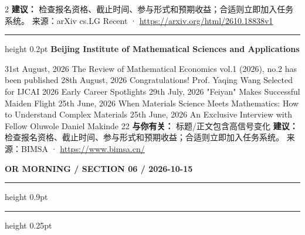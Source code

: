 \documentclass[10.5pt]{ctexart}
\begin{document}
\begin{multicols}{2}
\textbf{建议：} 检查报名资格、截止时间、参与形式和预期收益；合适则立即加入任务系统。
{\footnotesize\color{ormuted} 来源：arXiv cs.LG Recent · \url{https://arxiv.org/html/2610.18838v1}}
\vspace{2mm}
\hrule height 0.2pt
\vspace{2mm}
{\large\bfseries Beijing Institute of Mathematical Sciences and Applications}\par
31st August, 2026 The Review of Mathematical Economics vol.1 (2026), no.2 has been published 28th August, 2026 Congratulations! Prof. Yaqing Wang Selected for IJCAI 2026 Early Career Spotlights 29th July, 2026 "Feiyan" Makes Successful Maiden Flight 25th June, 2026 When Materials Science Meets Mathematics: How to Understand Complex Materials 25th June, 2026 An Exclusive Interview with Fellow Oluwole Daniel Makinde 22
\textbf{与你有关：} 标题/正文包含高信号变化
\textbf{建议：} 检查报名资格、截止时间、参与形式和预期收益；合适则立即加入任务系统。
{\footnotesize\color{ormuted} 来源：BIMSA · \url{https://www.bimsa.cn/}}
\end{multicols}
\newpage
{\small\bfseries OR MORNING / SECTION 06 / 2026-10-15}
\vspace{2mm}
\hrule height 0.9pt
\vspace{1.5mm}
\hrule height 0.25pt
\vspace{4mm}
\end{document}
